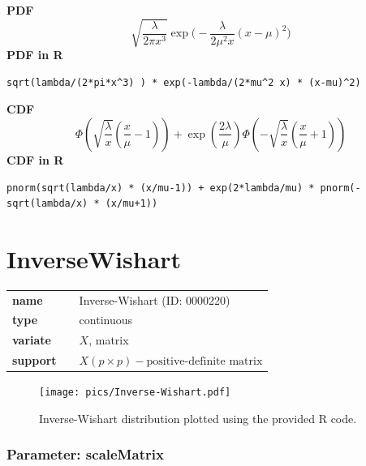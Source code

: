\documentclass{article}
\begin{document}
\smallskip \noindent \hspace{.2cm} \textbf{PDF} 
\begin{equation*}\sqrt{\frac{\lambda}{2\pi x^3}} \exp\Big(-\frac{\lambda}{2\mu^2 x}(x-\mu)^2\Big)\end{equation*}
\smallskip \noindent \hspace{.2cm} \textbf{PDF in R}  
\begin{verbatim}sqrt(lambda/(2*pi*x^3) ) * exp(-lambda/(2*mu^2 x) * (x-mu)^2)\end{verbatim}
\smallskip \noindent \hspace{.2cm} \textbf{CDF} 
\begin{equation*}\Phi\left(\sqrt{\frac{\lambda}{x}} \left(\frac{x}{\mu}-1 \right)\right) +\exp\left(\frac{2 \lambda}{\mu}\right) \Phi\left(-\sqrt{\frac{\lambda}{x}}\left(\frac{x}{\mu}+1 \right)\right)\end{equation*}
\smallskip \noindent \hspace{.2cm} \textbf{CDF in R} 
\begin{verbatim}pnorm(sqrt(lambda/x) * (x/mu-1)) + exp(2*lambda/mu) * pnorm(-sqrt(lambda/x) * (x/mu+1))\end{verbatim}
\smallskip\section*{InverseWishart} 

  \bigskip 

\begin{tabular}{p{2cm}cl}
\textbf{name} & & Inverse-Wishart (ID: 0000220)\\ 
 
\textbf{type} & & continuous \\ 

\textbf{variate} & & $X$, matrix \\ 

\textbf{support} & & $X(p \times p) - \text{positive-definite matrix}$
\end{tabular}

\begin{figure}[ht!]
\centering
  \texttt{[image: pics/Inverse-Wishart.pdf]}
 \caption{Inverse-Wishart distribution plotted using the provided R code.}
 \label{fig:Inverse-Wishart}
\end{figure}

\subsubsection*{Parameter: scaleMatrix}
\end{document}
